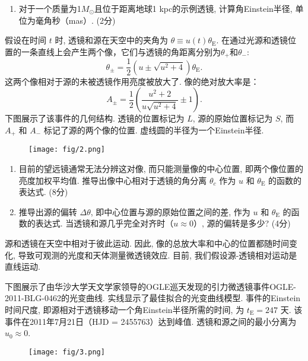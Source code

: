 \documentclass[a4paper,fontset=fandol]{ctexart}
\begin{document}
	\begin{enumerate}[label=(\alph*)]
		\item 对于一个质量为1\( M_\odot \)且位于距离地球1 kpc的示例透镜, 计算角Einstein半径, 单位为毫角秒（mas）. \hfill(2分)
	\end{enumerate}
	
	假设在时间 \( t \) 时, 透镜和源在天空中的夹角为 \( \theta \equiv u(t)\theta_\mathrm{E} \). 
	在通过光源和透镜位置的一条直线上会产生两个像，它们与透镜的角距离分别为$\theta_+$和$\theta_-$:
	\[\theta_\pm = \dfrac{1}{2}(u \pm \sqrt{u^2 + 4})\theta_\mathrm{E}.\]
	这两个像相对于源的未被透镜作用亮度被放大了. 像的绝对放大率是：
	\[A_\pm = \dfrac{1}{2}\left(\dfrac{u^2 + 2}{u\sqrt{u^2 + 4}} \pm 1\right).\]
	下图展示了该事件的几何结构. 透镜的位置标记为 \( L \), 源的原始位置标记为 \( S \), 而 \( A_+ \) 和 \( A_- \) 标记了源的两个像的位置. 虚线圆的半径为一个Einstein半径. 
	
	\begin{figure}[!h]
		\centering
		\texttt{[image: fig/2.png]}
	\end{figure}
	
	\begin{enumerate}[label=(\alph*),start=2]
		\item 目前的望远镜通常无法分辨这对像, 而只能测量像的中心位置, 即两个像位置的亮度加权平均值. 推导出像中心相对于透镜的角分离 $\theta_c$ 作为 $u$ 和 $\theta_\mathrm{E}$ 的函数的表达式. \hfill(8分)
		
		\item 推导出源的偏转 $\Delta\theta$, 即中心位置与源的原始位置之间的差, 作为 $u$ 和 $\theta_\mathrm{E}$ 的函数的表达式. 当透镜和源几乎完全对齐时（$u\approx0$）, 源的偏转是多少? \hfill(4分)
	\end{enumerate}
	
	源和透镜在天空中相对于彼此运动. 因此, 像的总放大率和中心的位置都随时间变化, 导致可观测的光度和天体测量微透镜效应. 目前, 我们假设源-透镜相对运动是直线运动. 
	
	下图展示了由华沙大学天文学家领导的OGLE巡天发现的引力微透镜事件OGLE-2011-BLG-0462的光变曲线. 实线显示了最佳拟合的光变曲线模型. 事件的Einstein时间尺度, 即源相对于透镜移动一个角Einstein半径所需的时间, 为 $t_\mathrm{E} = 247\text{ 天}$. 该事件在2011年7月21日（HJD = 2455763）达到峰值. 透镜和源之间的最小分离为 $u_0 \approx 0$. 
	
	\begin{figure}[!h]
		\centering
		\texttt{[image: fig/3.png]}
	\end{figure}
	
\end{document}
